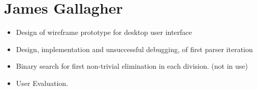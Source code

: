 \section{James Gallagher}

\begin{itemize}
\item Design of wireframe prototype for desktop user interface
\item Design, implementation and unsuccessful debugging, of first parser iteration
\item Binary search for first non-trivial elimination in each division. (not in use)
\item User Evaluation. 

 
\end{itemize}
